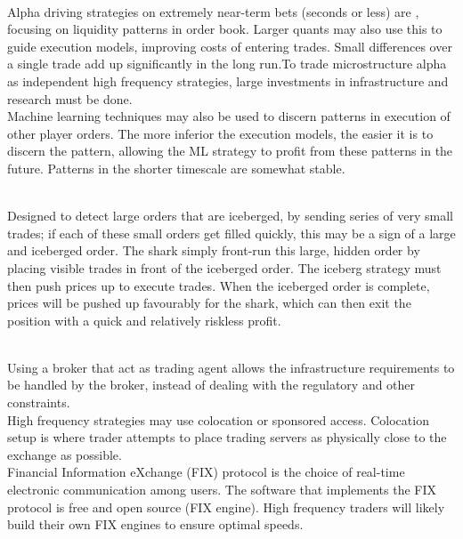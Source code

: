 \begin{definition} \\
Alpha driving strategies on extremely near-term bets (seconds or less) are , focusing on liquidity patterns in order book. Larger quants may also use this to guide execution models, improving costs of entering trades. Small differences over a single trade add up significantly in the long run.To trade microstructure alpha as independent high frequency strategies, large investments in infrastructure and research must be done.\\
Machine learning techniques may also be used to discern patterns in execution of other player orders. The more inferior the execution models, the easier it is to discern the pattern, allowing the ML strategy to profit from these patterns in the future. Patterns in the shorter timescale are somewhat stable.
\end{definition}

\begin{definition} \\
Designed to detect large orders that are iceberged, by sending series of very small trades; if each of these small orders get filled quickly, this may be a sign of a large and iceberged order. The shark simply front-run this large, hidden order by placing visible trades in front of the iceberged order. The iceberg strategy must then push prices up to execute trades. When the iceberged order is complete, prices will be pushed up favourably for the shark, which can then exit the position with a quick and relatively riskless profit.
\end{definition}

\begin{remark} \\
Using a broker that act as trading agent allows the infrastructure requirements to be handled by the broker, instead of dealing with the regulatory and other constraints. \\
High frequency strategies may use colocation or sponsored access. Colocation setup is where trader attempts to place trading servers as physically close to the exchange as possible.\\
Financial Information eXchange (FIX) protocol is the choice of real-time electronic communication among users. The software that implements the FIX protocol is free and open source (FIX engine). High frequency traders will likely build their own FIX engines to ensure optimal speeds.
\end{remark}

